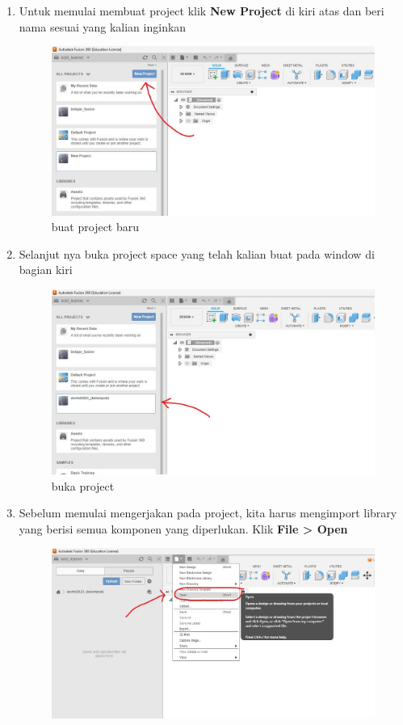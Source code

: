 \begin{enumerate}
    \item Untuk memulai membuat project klik \textbf{New Project} di kiri atas dan beri nama sesuai yang kalian inginkan
        \begin{figure}[H]
            \centering
            \includegraphics[width=0.6\linewidth]{P2/img/gambar1.jpeg}
            \caption{buat project baru} 
            \label{fig:buat project baru}
        \end{figure}
    \item Selanjut nya buka project space yang telah kalian buat pada window di bagian kiri
        \begin{figure}[H]
            \centering
            \includegraphics[width=0.6\linewidth]{P2/img/gambar2.jpeg}
            \caption{buka project} 
            \label{fig:buka project}
        \end{figure}
    \item Sebelum memulai mengerjakan pada project, kita harus mengimport library yang berisi semua komponen yang diperlukan. Klik \textbf{File > Open}
        \begin{figure}[H]
            \centering
            \includegraphics[width=0.6\linewidth]{P2/img/gambar3.jpeg}

\end{figure}
\end{enumerate}
